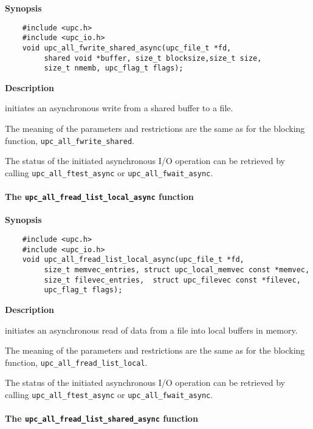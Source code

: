 {\bf Synopsis}

\npf\vspace{-2.5em} 

\begin{verbatim}
    #include <upc.h>
    #include <upc_io.h>
    void upc_all_fwrite_shared_async(upc_file_t *fd,
         shared void *buffer, size_t blocksize,size_t size,
         size_t nmemb, upc_flag_t flags);
\end{verbatim}

{\bf Description}

 initiates an asynchronous write from a
shared buffer to a file.

\np The meaning of the parameters and restrictions are the same as for the
blocking function, {\tt upc\_all\_fwrite\_shared}.

\np The status of the initiated asynchronous I/O operation can be retrieved by calling
{\tt upc\_all\_ftest\_async} or {\tt upc\_all\_fwait\_async}.

\paragraph{The {\tt upc\_all\_fread\_list\_local\_async} function}

{\bf Synopsis}

\npf\vspace{-2.5em}
\begin{verbatim}
    #include <upc.h>
    #include <upc_io.h> 
    void upc_all_fread_list_local_async(upc_file_t *fd,
         size_t memvec_entries, struct upc_local_memvec const *memvec,
         size_t filevec_entries,  struct upc_filevec const *filevec,
         upc_flag_t flags);
\end{verbatim}

{\bf Description}

 initiates an asynchronous read of
data from a file into local buffers in memory.

\np The meaning of the parameters and restrictions are the same as for the
blocking function, {\tt upc\_all\_fread\_list\_local}.

\np The status of the initiated asynchronous I/O operation can be retrieved by calling
{\tt upc\_all\_ftest\_async} or {\tt upc\_all\_fwait\_async}.

\paragraph{The {\tt upc\_all\_fread\_list\_shared\_async} function}

